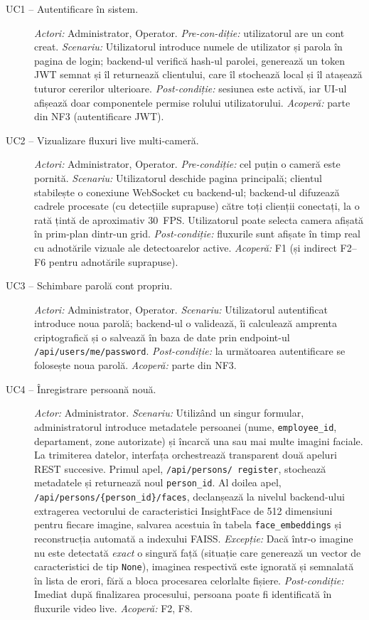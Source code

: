 \documentclass[../../main.tex]{subfiles}
\begin{document}
\begin{description}
    \item[UC1 -- Autentificare în sistem.] \textit{Actori:} Administrator, Operator. \textit{Pre-con-diție:} utilizatorul are un cont creat. \textit{Scenariu:} Utilizatorul introduce numele de utilizator și parola în pagina de login; backend-ul verifică hash-ul parolei, generează un token JWT semnat și îl returnează clientului, care îl stochează local și îl atașează tuturor cererilor ulterioare. \textit{Post-condiție:} sesiunea este activă, iar UI-ul afișează doar componentele permise rolului utilizatorului. \textit{Acoperă:} parte din NF3 (autentificare JWT).

    \item[UC2 -- Vizualizare fluxuri live multi-cameră.] \textit{Actori:} Administrator, Operator. \textit{Pre-condiție:} cel puțin o cameră este pornită. \textit{Scenariu:} Utilizatorul deschide pagina principală; clientul stabilește o conexiune WebSocket cu backend-ul; backend-ul difuzează cadrele procesate (cu detecțiile suprapuse) către toți clienții conectați, la o rată țintă de aproximativ 30~FPS. Utilizatorul poate selecta camera afișată în prim-plan dintr-un grid. \textit{Post-condiție:} fluxurile sunt afișate în timp real cu adnotările vizuale ale detectoarelor active. \textit{Acoperă:} F1 (și indirect F2--F6 pentru adnotările suprapuse).

	\item[UC3 -- Schimbare parolă cont propriu.] \textit{Actori:} Administrator, Operator. \textit{Scenariu:} Utilizatorul autentificat introduce noua parolă; backend-ul o validează, îi calculează amprenta criptografică și o salvează în baza de date prin endpoint-ul \texttt{/api/users/me/password}. \textit{Post-condiție:} la următoarea autentificare se folosește noua parolă. \textit{Acoperă:} parte din NF3.

    \item[UC4 -- Înregistrare persoană nouă.]  \textit{Actor:} Administrator. \textit{Scenariu:} Utilizând un singur formular, administratorul introduce metadatele persoanei (nume, \texttt{employee\_id}, departament, zone autorizate) și încarcă una sau mai multe imagini faciale. La trimiterea datelor, interfața orchestrează transparent două apeluri REST succesive. Primul apel, \texttt{/api/persons/
    	register}, stochează metadatele și returnează noul \texttt{person\_id}. Al doilea apel, \texttt{/api/persons/\{person\_id\}/faces}, declanșează la nivelul \linebreak backend-ului extragerea vectorului de caracteristici InsightFace de 512 dimensiuni pentru fiecare imagine, salvarea acestuia în tabela \linebreak \texttt{face\_embeddings} și reconstrucția automată a indexului FAISS. \textit{Excepție:} Dacă într-o imagine nu este detectată \emph{exact} o singură față (situație care generează un vector de caracteristici de tip \texttt{None}), imaginea respectivă este ignorată și semnalată în lista de erori, fără a bloca procesarea celorlalte fișiere. \textit{Post-condiție:} Imediat după finalizarea procesului, persoana poate fi identificată în fluxurile video live. \textit{Acoperă:} F2, F8.


\end{description}
\end{document}
